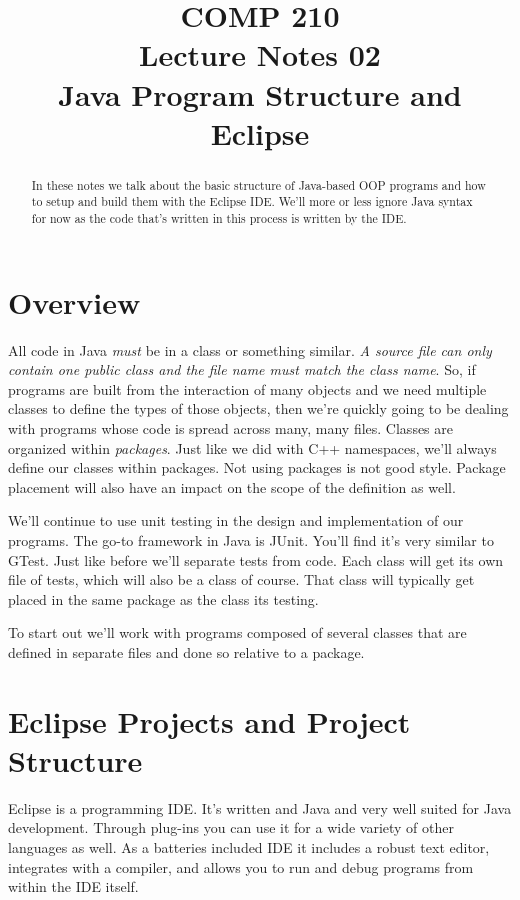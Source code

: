 \documentclass[nobib]{tufte-handout}
\title{COMP 210 \\ Lecture Notes 02 \\ Java Program Structure and Eclipse}
\begin{document}
\maketitle

\begin{abstract}
In these notes we talk about the basic structure of Java-based OOP programs and how to setup and build them with the Eclipse IDE\@. We'll more or less ignore Java syntax for now as the code that's written in this process is written by the IDE\@.
\end{abstract}

\section{Overview}

All code in Java \textit{must} be in a class or something similar. \textit{A source file can only contain one public class and the file name must match the class name}. So, if programs are built from the interaction of many objects and we need multiple classes to define the types of those objects, then we're quickly going to be dealing with programs whose code is spread across many, many files. Classes are organized within \textit{packages}. Just like we did with C++ namespaces, we'll always define our classes within packages. Not using packages is not good style. Package placement will also have an impact on the scope of the definition as well.

We'll continue to use unit testing in the design and implementation of our programs.  The go-to framework in Java is JUnit. You'll find it's very similar to GTest. Just like before we'll separate tests from code. Each class will get its own file of tests, which will also be a class of course. That class will typically get placed in the same package as the class its testing.

To start out we'll work with programs composed of several classes that are defined in separate files and done so relative to a package.


\section{Eclipse Projects and Project Structure}

Eclipse is a programming IDE\@. It's written and Java and very well suited for Java development. Through plug-ins you can use it for a wide variety of other languages as well. As a batteries included IDE it includes a robust text editor, integrates with a compiler, and allows you to run and debug programs from within the IDE itself.
\end{document}
